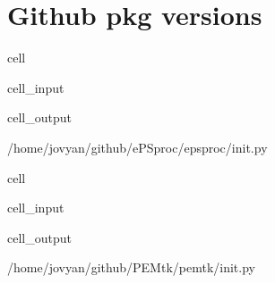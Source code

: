 \documentclass[letterpaper,table,10pt,english]{jupyterBook}
\begin{document}
\section{Github pkg versions}
\label{\detokenize{tests/build_versions_checks:github-pkg-versions}}
\begin{sphinxuseclass}{cell}\begin{sphinxVerbatimInput}

\begin{sphinxuseclass}{cell_input}
\begin{sphinxVerbatim}[commandchars=\\\{\}]
   
   
\end{sphinxVerbatim}

\end{sphinxuseclass}\end{sphinxVerbatimInput}
\begin{sphinxVerbatimOutput}

\begin{sphinxuseclass}{cell_output}
\begin{sphinxVerbatim}[commandchars=\\\{\}]
\PYGZsq{}/home/jovyan/github/ePSproc/epsproc/\PYGZus{}\PYGZus{}init\PYGZus{}\PYGZus{}.py\PYGZsq{}
\end{sphinxVerbatim}

\end{sphinxuseclass}\end{sphinxVerbatimOutput}

\end{sphinxuseclass}
\begin{sphinxuseclass}{cell}\begin{sphinxVerbatimInput}

\begin{sphinxuseclass}{cell_input}
\begin{sphinxVerbatim}[commandchars=\\\{\}]
   
\end{sphinxVerbatim}

\end{sphinxuseclass}\end{sphinxVerbatimInput}
\begin{sphinxVerbatimOutput}

\begin{sphinxuseclass}{cell_output}
\begin{sphinxVerbatim}[commandchars=\\\{\}]
\PYGZsq{}/home/jovyan/github/PEMtk/pemtk/\PYGZus{}\PYGZus{}init\PYGZus{}\PYGZus{}.py\PYGZsq{}
\end{sphinxVerbatim}

\end{sphinxuseclass}\end{sphinxVerbatimOutput}

\end{sphinxuseclass}
\end{document}
